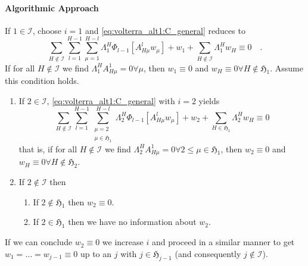 	
	\paragraph*{Algorithmic Approach} If $1\in \mathcal{I}$, choose $i=1$ and 
	\eqref{eq:volterra_alt1:C_general} reduces to
	\begin{equation}
	\sum\limits_{H\notin \mathcal{I}}\sum\limits_{l=1}^{H-1}\sum\limits_{\mu=1}^{H-l}
	\Lambda_1^H \Phi_{l-1}\left[A^l_{H\mu} w_\mu \right] +
	w_1 + \sum\limits_{H\notin\mathcal{I}} \Lambda_1^H w_H \equiv 0 \quad . 
	\end{equation}
	If for all $H\notin\mathcal{I}$ we find $\Lambda^H_1 A^1_{H\mu}
	=0\forall \mu $, then $w_1\equiv 0$ and $w_H\equiv 0\forall H\notin \mathfrak{H}_1$. 
	Assume this condition holds.
	\begin{enumerate}
		\item If $2\in \mathcal{I}$, \eqref{eq:volterra_alt1:C_general} with $i=2$ yields
		\begin{equation}
		\sum\limits_{H\notin\mathcal{I}} \sum\limits_{l=1}^{H-1}
		\sum\limits_{\substack{\mu=2 \\ \mu \in\mathfrak{H}_1}}^{H-l}
		\Lambda_2^H \Phi_{l-1}\left[ A^l_{H\mu} w_\mu \right] +w_2 + 
		\sum\limits_{ H\in \mathfrak{H}_1} \Lambda_2^H w_H \equiv 0
		\end{equation}		 
		that is, if for all $H\notin \mathcal{I}$ we find 
		$\Lambda^H_2 A^1_{H\mu} = 0\forall 2\leq\mu\in \mathfrak{H}_1$, then 
		$w_2\equiv 0$ and $w_H\equiv 0 \forall H\notin \mathfrak{H}_2$.
		\item If $2\notin \mathcal{I}$ then
			\begin{enumerate}
			\item If $2\notin \mathfrak{H}_1$ then $w_2\equiv 0$.
			\item If $2\in\mathfrak{H}_1$ then 
			we have no information about $w_2$.
			\end{enumerate}
	\end{enumerate}
	If we can conclude $w_2\equiv 0$ we increase $i$ and  proceed in a similar 
	manner to get $w_1=\ldots = w_{j-1}\equiv 0$ up to an $j$ with 
	$j\in \mathfrak{H}_{j-1}$ (and consequently $j\notin\mathcal{I}$).\\

